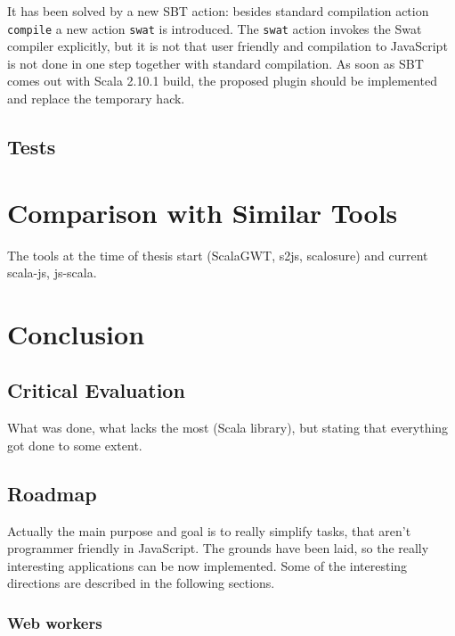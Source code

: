 \documentclass[12pt,a4paper]{report}
\begin{document}
It has been solved by a new SBT action: besides standard compilation action \texttt{compile} a new action \texttt{swat} is introduced. The \texttt{swat} action invokes the Swat compiler explicitly, but it is not that user friendly and compilation to JavaScript is not done in one step together with standard compilation. As soon as SBT comes out with Scala 2.10.1 build, the proposed plugin should be implemented and replace the temporary hack.

\section{Tests}



\chapter{Comparison with Similar Tools}

The tools at the time of thesis start (ScalaGWT, s2js, scalosure) and current scala-js, js-scala.



\chapter{Conclusion}

\section{Critical Evaluation}

What was done, what lacks the most (Scala library), but stating that everything got done to some extent.

\section{Roadmap}

Actually the main purpose and goal is to really simplify tasks, that aren't programmer friendly in JavaScript. The grounds have been laid, so the really interesting applications can be now implemented. Some of the interesting directions are described in the following sections.

\subsection{Web workers}
\end{document}
